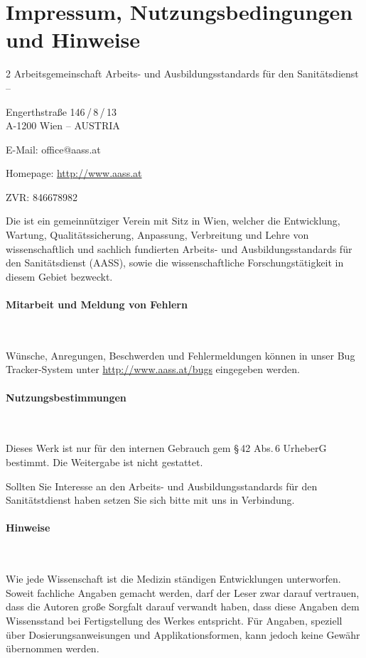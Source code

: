 \documentclass[
ngerman,
paper=a4,
asymmetric,
fontsize=9pt,
headings=small,
draft=false,
parskip=false,
footnotes=multiple,
]{scrbook}
\begin{document}
\section*{Impressum, Nutzungsbedingungen und Hinweise}
\begin{multicols}{2}
{\sffamily Arbeitsgemeinschaft Arbeits- und Ausbildungsstandards für den
Sanitätsdienst -- }{\ARGEAASS}

Engerthstraße 146\,/\,8\,/\,13 \\ A-1200 Wien -- AUSTRIA

E-Mail: office@aass.at

Homepage: \url{http://www.aass.at}

ZVR: 846678982

Die {\ARGEAASS} ist ein gemeinnütziger Verein mit Sitz in Wien, welcher die
Entwicklung, Wartung, Qualitätssicherung, Anpassung, Verbreitung und Lehre von
wissenschaftlich und sachlich fundierten Arbeits- und Ausbildungsstandards für
den Sanitätsdienst (AASS), sowie die wissenschaftliche Forschungstätigkeit in
diesem Gebiet bezweckt.

\paragraph*{Mitarbeit und Meldung von Fehlern}~

Wünsche, Anregungen, Beschwerden und Fehlermeldungen können
in unser Bug Tracker-System unter
\url{http://www.aass.at/bugs} eingegeben werden.

\paragraph*{Nutzungsbestimmungen}~

Dieses Werk ist nur für den internen Gebrauch gem §\,42
Abs.\,6 UrheberG bestimmt. Die Weitergabe ist nicht
gestattet. 

Sollten Sie Interesse an den Arbeits- und
Ausbildungsstandards für den Sanitätstdienst haben setzen
Sie sich bitte mit uns in Verbindung.

\begin{minipage}{\linewidth}
\paragraph*{Hinweise}~

Wie jede Wissenschaft ist die Medizin ständigen Ent\-wicklungen
unterworfen. Soweit fachliche Angaben ge\-macht werden, darf der Leser
zwar darauf ver\-trau\-en, dass die Autoren gro{\ss}e Sorg\-falt
da\-rauf verwandt haben, dass diese An\-ga\-ben dem Wissens\-stand bei
Ferti\-gstel\-lung des Werkes entspricht. Für Angaben, spe\-ziell
über Dosierungsanweisungen und Ap\-plikations\-formen, kann jedoch
keine Ge\-währ übernommen werden. 
\end{minipage}


\end{multicols}
\end{document}
